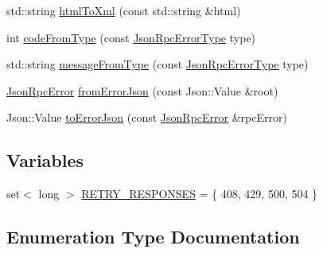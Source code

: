 \begin{DoxyCompactItemize}
std\+::string \hyperlink{namespacedg_1_1deepcore_1_1network_af2d3502a6309acacaebc8b19a0cf76bb}{html\+To\+Xml} (const std\+::string \&html)
\item 
int \hyperlink{namespacedg_1_1deepcore_1_1network_a50c68eaf4787d70e3236ceea5c651aed}{code\+From\+Type} (const \hyperlink{namespacedg_1_1deepcore_1_1network_a396e76c62ff66c95c20af09d8e45ce44}{Json\+Rpc\+Error\+Type} type)
\item 
std\+::string \hyperlink{namespacedg_1_1deepcore_1_1network_ad7e27867c00b5fbca5999693c70d9e99}{message\+From\+Type} (const \hyperlink{namespacedg_1_1deepcore_1_1network_a396e76c62ff66c95c20af09d8e45ce44}{Json\+Rpc\+Error\+Type} type)
\item 
\hyperlink{classdg_1_1deepcore_1_1network_1_1_json_rpc_error}{Json\+Rpc\+Error} \hyperlink{namespacedg_1_1deepcore_1_1network_aefe6d53131bd9a612d7d806bfe4358ad}{from\+Error\+Json} (const Json\+::\+Value \&root)
\item 
Json\+::\+Value \hyperlink{namespacedg_1_1deepcore_1_1network_af041406cc8c73fcda34f96399159d9c2}{to\+Error\+Json} (const \hyperlink{classdg_1_1deepcore_1_1network_1_1_json_rpc_error}{Json\+Rpc\+Error} \&rpc\+Error)
\end{DoxyCompactItemize}
\subsection*{Variables}
\begin{DoxyCompactItemize}
\item 
set$<$ long $>$ \hyperlink{namespacedg_1_1deepcore_1_1network_aac2ec119bfabeb0695c296eeffaac58c}{R\+E\+T\+R\+Y\+\_\+\+R\+E\+S\+P\+O\+N\+S\+ES} = \{ 408, 429, 500, 504 \}
\end{DoxyCompactItemize}


\subsection{Enumeration Type Documentation}
